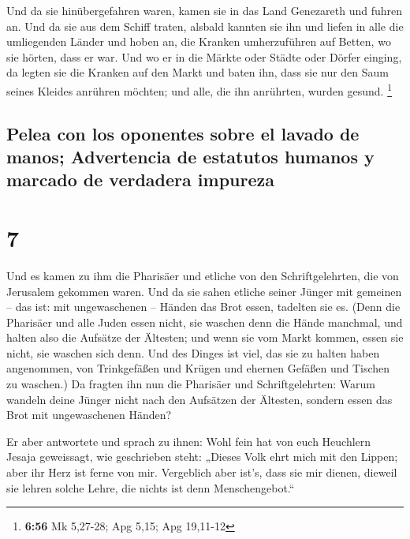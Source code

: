  Und da sie hinübergefahren waren, kamen sie in das Land
Genezareth und fuhren an.  Und da sie aus dem Schiff
traten, alsbald kannten sie ihn  und liefen in alle die
umliegenden Länder und hoben an, die Kranken umherzuführen auf Betten,
wo sie hörten, dass er war.  Und wo er in die Märkte oder
Städte oder Dörfer einging, da legten sie die Kranken auf den Markt und
baten ihn, dass sie nur den Saum seines Kleides anrühren möchten; und
alle, die ihn anrührten, wurden gesund. \footnote{\textbf{6:56} Mk
  5,27-28; Apg 5,15; Apg 19,11-12}

\hypertarget{pelea-con-los-oponentes-sobre-el-lavado-de-manos-advertencia-de-estatutos-humanos-y-marcado-de-verdadera-impureza}{%
\subsection{Pelea con los oponentes sobre el lavado de manos;
Advertencia de estatutos humanos y marcado de verdadera
impureza}\label{pelea-con-los-oponentes-sobre-el-lavado-de-manos-advertencia-de-estatutos-humanos-y-marcado-de-verdadera-impureza}}

\hypertarget{section-6}{%
\section{7}\label{section-6}}

 Und es kamen zu ihm die Pharisäer und etliche von den
Schriftgelehrten, die von Jerusalem gekommen waren.  Und
da sie sahen etliche seiner Jünger mit gemeinen -- das ist: mit
ungewaschenen -- Händen das Brot essen, tadelten sie es. 
(Denn die Pharisäer und alle Juden essen nicht, sie waschen denn die
Hände manchmal, und halten also die Aufsätze der Ältesten;
 und wenn sie vom Markt kommen, essen sie nicht, sie
waschen sich denn. Und des Dinges ist viel, das sie zu halten haben
angenommen, von Trinkgefäßen und Krügen und ehernen Gefäßen und Tischen
zu waschen.)  Da fragten ihn nun die Pharisäer und
Schriftgelehrten: Warum wandeln deine Jünger nicht nach den Aufsätzen
der Ältesten, sondern essen das Brot mit ungewaschenen Händen?

 Er aber antwortete und sprach zu ihnen: Wohl fein hat von
euch Heuchlern Jesaja geweissagt, wie geschrieben steht: „Dieses Volk
ehrt mich mit den Lippen; aber ihr Herz ist ferne von mir.
 Vergeblich aber ist's, dass sie mir dienen, dieweil sie
lehren solche Lehre, die nichts ist denn Menschengebot.``

